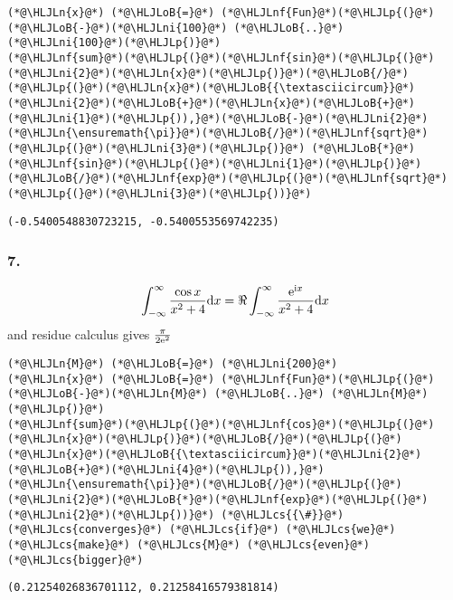 \documentclass[12pt,a4paper]{article}
\newcommand{\HLJLn}[1]{#1}
\newcommand{\HLJLnf}[1]{\textcolor[RGB]{66,102,213}{#1}}
\newcommand{\HLJLni}[1]{\textcolor[RGB]{59,151,46}{#1}}
\newcommand{\HLJLoB}[1]{\textcolor[RGB]{102,102,102}{\textbf{#1}}}
\newcommand{\HLJLp}[1]{#1}
\newcommand{\HLJLcs}[1]{\textcolor[RGB]{153,153,119}{\textit{#1}}}
\def\D{ {\rm d} }
\def\I{ {\rm i} }
\def\E{ {\rm e} }
\def\dx{\D x}
\begin{document}
\begin{lstlisting}
(*@\HLJLn{x}@*) (*@\HLJLoB{=}@*) (*@\HLJLnf{Fun}@*)(*@\HLJLp{(}@*)(*@\HLJLoB{-}@*)(*@\HLJLni{100}@*) (*@\HLJLoB{..}@*) (*@\HLJLni{100}@*)(*@\HLJLp{)}@*)
(*@\HLJLnf{sum}@*)(*@\HLJLp{(}@*)(*@\HLJLnf{sin}@*)(*@\HLJLp{(}@*)(*@\HLJLni{2}@*)(*@\HLJLn{x}@*)(*@\HLJLp{)}@*)(*@\HLJLoB{/}@*)(*@\HLJLp{(}@*)(*@\HLJLn{x}@*)(*@\HLJLoB{{\textasciicircum}}@*)(*@\HLJLni{2}@*)(*@\HLJLoB{+}@*)(*@\HLJLn{x}@*)(*@\HLJLoB{+}@*)(*@\HLJLni{1}@*)(*@\HLJLp{)),}@*)(*@\HLJLoB{-}@*)(*@\HLJLni{2}@*)(*@\HLJLn{\ensuremath{\pi}}@*)(*@\HLJLoB{/}@*)(*@\HLJLnf{sqrt}@*)(*@\HLJLp{(}@*)(*@\HLJLni{3}@*)(*@\HLJLp{)}@*) (*@\HLJLoB{*}@*) (*@\HLJLnf{sin}@*)(*@\HLJLp{(}@*)(*@\HLJLni{1}@*)(*@\HLJLp{)}@*)(*@\HLJLoB{/}@*)(*@\HLJLnf{exp}@*)(*@\HLJLp{(}@*)(*@\HLJLnf{sqrt}@*)(*@\HLJLp{(}@*)(*@\HLJLni{3}@*)(*@\HLJLp{))}@*)
\end{lstlisting}

\begin{lstlisting}
(-0.5400548830723215, -0.5400553569742235)
\end{lstlisting}


\subsubsection{7.}
\[
	\int_{-\infty}^\infty    {\cos x \over x^2 + 4} \dx = \Re 	\int_{-\infty}^\infty    {\E^{\I x}\over x^2 + 4} \dx
\]
and residue calculus gives ${\pi \over 2 \E^2}$


\begin{lstlisting}
(*@\HLJLn{M}@*) (*@\HLJLoB{=}@*) (*@\HLJLni{200}@*)
(*@\HLJLn{x}@*) (*@\HLJLoB{=}@*) (*@\HLJLnf{Fun}@*)(*@\HLJLp{(}@*)(*@\HLJLoB{-}@*)(*@\HLJLn{M}@*) (*@\HLJLoB{..}@*) (*@\HLJLn{M}@*)(*@\HLJLp{)}@*)
(*@\HLJLnf{sum}@*)(*@\HLJLp{(}@*)(*@\HLJLnf{cos}@*)(*@\HLJLp{(}@*)(*@\HLJLn{x}@*)(*@\HLJLp{)}@*)(*@\HLJLoB{/}@*)(*@\HLJLp{(}@*)(*@\HLJLn{x}@*)(*@\HLJLoB{{\textasciicircum}}@*)(*@\HLJLni{2}@*)(*@\HLJLoB{+}@*)(*@\HLJLni{4}@*)(*@\HLJLp{)),}@*)(*@\HLJLn{\ensuremath{\pi}}@*)(*@\HLJLoB{/}@*)(*@\HLJLp{(}@*)(*@\HLJLni{2}@*)(*@\HLJLoB{*}@*)(*@\HLJLnf{exp}@*)(*@\HLJLp{(}@*)(*@\HLJLni{2}@*)(*@\HLJLp{))}@*) (*@\HLJLcs{{\#}}@*) (*@\HLJLcs{converges}@*) (*@\HLJLcs{if}@*) (*@\HLJLcs{we}@*) (*@\HLJLcs{make}@*) (*@\HLJLcs{M}@*) (*@\HLJLcs{even}@*) (*@\HLJLcs{bigger}@*)
\end{lstlisting}

\begin{lstlisting}
(0.21254026836701112, 0.21258416579381814)
\end{lstlisting}
\end{document}
